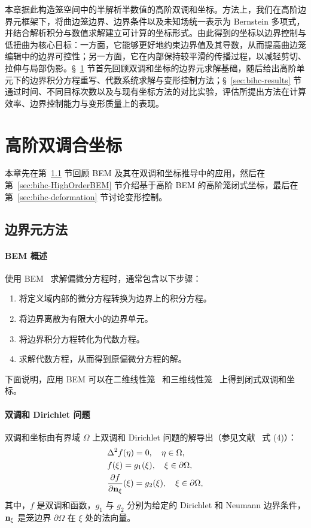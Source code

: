 本章据此构造笼空间中的半解析半数值的高阶双调和坐标。方法上，我们在高阶边界元框架下，将曲边笼边界、边界条件以及未知场统一表示为 Bernstein 多项式，并结合解析积分与数值求解建立可计算的坐标形式。由此得到的坐标以边界控制与低扭曲为核心目标：一方面，它能够更好地约束边界值及其导数，从而提高曲边笼编辑中的边界可控性；另一方面，它在内部保持较平滑的传播过程，以减轻剪切、拉伸与局部伪影。\S~\ref{sec:bihc-method} 节首先回顾双调和坐标的边界元求解基础，随后给出高阶单元下的边界积分方程重写、代数系统求解与变形控制方法；\S~\ref{sec:bihc-results} 节通过时间、不同目标次数以及与现有坐标方法的对比实验，评估所提出方法在计算效率、边界控制能力与变形质量上的表现。



\section{高阶双调合坐标}\label{sec:bihc-method}
本章先在第~\ref{sec:bihc-revisit} 节回顾 BEM 及其在双调和坐标推导中的应用，然后在第~\ref{sec:bihc-HighOrderBEM} 节介绍基于高阶 BEM 的高阶笼闭式坐标，最后在第~\ref{sec:bihc-deformation} 节讨论变形控制。

\subsection{边界元方法}\label{sec:bihc-revisit}
\paragraph{BEM 概述}
使用 BEM~\cite{Brebbia1978TheBE} 求解偏微分方程时，通常包含以下步骤：
\begin{enumerate}
    \item 将定义域内部的微分方程转换为边界上的积分方程。
    \item 将边界离散为有限大小的边界单元。
    \item 将边界积分方程转化为代数方程。
    \item 求解代数方程，从而得到原偏微分方程的解。
\end{enumerate}
下面说明，应用 BEM 可以在二维线性笼~\cite{Weber2012} 和三维线性笼~\cite{thiery2024biharmonic} 上得到闭式双调和坐标。

\paragraph{双调和 Dirichlet 问题}
双调和坐标由有界域 $\Omega$ 上双调和 Dirichlet 问题的解导出（参见文献~\cite{Weber2012} 式 (4)）：
\begin{equation}\label{equ:bihc-bihPDE}
\begin{aligned}
    &\Delta^2 f(\eta) = 0, \quad \eta \in \Omega, \\
    &f(\xi) = g_1(\xi), \quad \xi \in \partial \Omega, \\
    &\frac{\partial f}{\partial \mathbf{n}_{\xi}}(\xi) = g_2(\xi), \quad \xi \in \partial \Omega,
\end{aligned}
\end{equation}
其中，$f$ 是双调和函数，\(g_1\) 与 \(g_2\) 分别为给定的 Dirichlet 和 Neumann 边界条件，\(\mathbf{n}_{\xi}\) 是笼边界 \(\partial\Omega\) 在 \(\xi\) 处的法向量。

